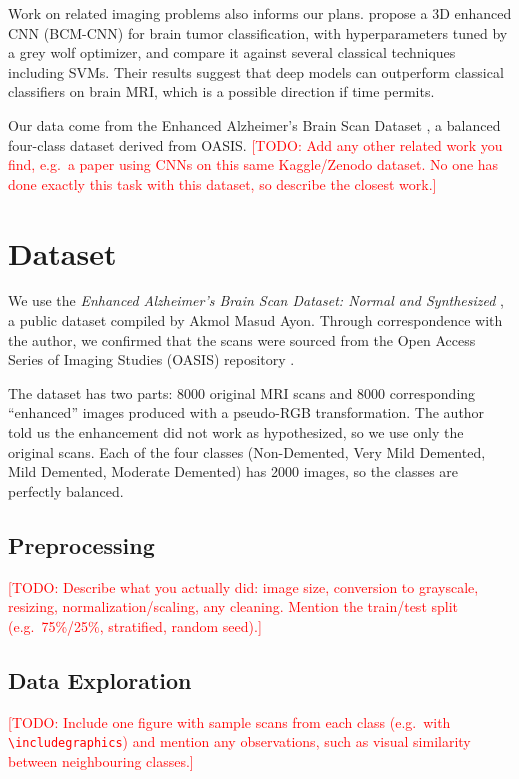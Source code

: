\documentclass[11pt]{article}
\newcommand{\todo}[1]{\textcolor{red}{[TODO: #1]}}
\begin{document}
Work on related imaging problems also informs our plans. \citet{bcmcnn2023} propose a 3D enhanced CNN (BCM-CNN) for brain tumor classification, with hyperparameters tuned by a grey wolf optimizer, and compare it against several classical techniques including SVMs. Their results suggest that deep models can outperform classical classifiers on brain MRI, which is a possible direction if time permits.

Our data come from the Enhanced Alzheimer's Brain Scan Dataset \citep{masud2024}, a balanced four-class dataset derived from OASIS. \todo{Add any other related work you find, e.g.\ a paper using CNNs on this same Kaggle/Zenodo dataset. No one has done exactly this task with this dataset, so describe the closest work.}

\section{Dataset}

We use the \textit{Enhanced Alzheimer's Brain Scan Dataset: Normal and Synthesized} \citep{masud2024}, a public dataset compiled by Akmol Masud Ayon. Through correspondence with the author, we confirmed that the scans were sourced from the Open Access Series of Imaging Studies (OASIS) repository \citep{marcus2007}.

The dataset has two parts: 8000 original MRI scans and 8000 corresponding ``enhanced'' images produced with a pseudo-RGB transformation. The author told us the enhancement did not work as hypothesized, so we use only the original scans. Each of the four classes (Non-Demented, Very Mild Demented, Mild Demented, Moderate Demented) has 2000 images, so the classes are perfectly balanced.

\subsection{Preprocessing}

\todo{Describe what you actually did: image size, conversion to grayscale, resizing, normalization/scaling, any cleaning. Mention the train/test split (e.g.\ 75\%/25\%, stratified, random seed).}

\subsection{Data Exploration}

\todo{Include one figure with sample scans from each class (e.g.\ with \texttt{\textbackslash includegraphics}) and mention any observations, such as visual similarity between neighbouring classes.}
\end{document}
